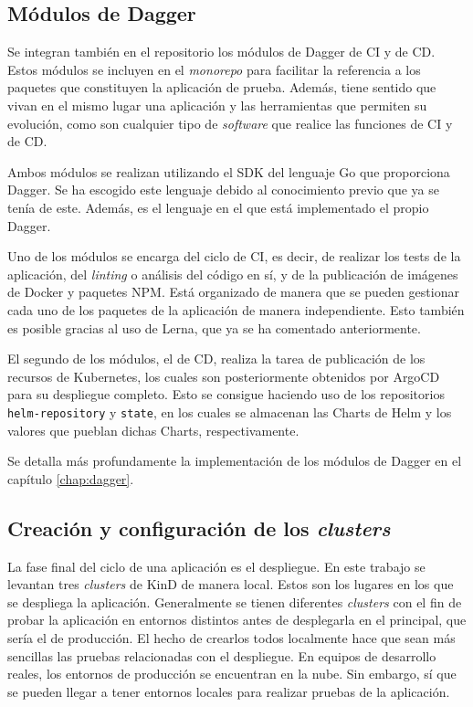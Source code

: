 \subsection*{Módulos de Dagger}

Se integran también en el repositorio los módulos de Dagger de CI y de CD. Estos módulos se incluyen en el \textit{monorepo} para facilitar la referencia a los paquetes que constituyen la aplicación de prueba. Además, tiene sentido que vivan en el mismo lugar una aplicación y las herramientas que permiten su evolución, como son cualquier tipo de \textit{software} que realice las funciones de CI y de CD.

Ambos módulos se realizan utilizando el SDK del lenguaje Go que proporciona Dagger. Se ha escogido este lenguaje debido al conocimiento previo que ya se tenía de este. Además, es el lenguaje en el que está implementado el propio Dagger.

Uno de los módulos se encarga del ciclo de CI, es decir, de realizar los tests de la aplicación, del \textit{linting} o análisis del código en sí, y de la publicación de imágenes de Docker y paquetes NPM. Está organizado de manera que se pueden gestionar cada uno de los paquetes de la aplicación de manera independiente. Esto también es posible gracias al uso de Lerna, que ya se ha comentado anteriormente.

El segundo de los módulos, el de CD, realiza la tarea de publicación de los recursos de Kubernetes, los cuales son posteriormente obtenidos por ArgoCD para su despliegue completo. Esto se consigue haciendo uso de los repositorios \texttt{helm-repository} y \texttt{state}, en los cuales se almacenan las Charts de Helm y los valores que pueblan dichas Charts, respectivamente.

Se detalla más profundamente la implementación de los módulos de Dagger en el capítulo \ref{chap:dagger}.

\subsection*{Creación y configuración de los \textit{clusters}}
\label{subsec:clusters}

La fase final del ciclo de una aplicación es el despliegue. En este trabajo se levantan tres \textit{clusters} de KinD de manera local. Estos son los lugares en los que se despliega la aplicación. Generalmente se tienen diferentes \textit{clusters} con el fin de probar la aplicación en entornos distintos antes de desplegarla en el principal, que sería el de producción. El hecho de crearlos todos localmente hace que sean más sencillas las pruebas relacionadas con el despliegue. En equipos de desarrollo reales, los entornos de producción se encuentran en la nube. Sin embargo, sí que se pueden llegar a tener entornos locales para realizar pruebas de la aplicación.

